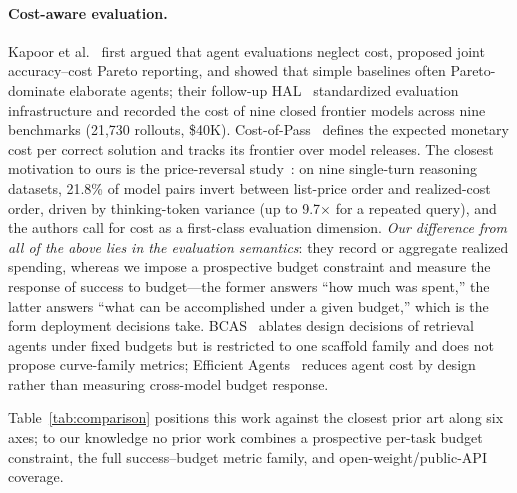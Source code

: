 \documentclass[preprint,authoryear,12pt]{elsarticle}
\begin{document}
\paragraph{Cost-aware evaluation.} Kapoor et al.~\cite{kapoor2025aiagentsmatter} first argued that agent evaluations neglect cost, proposed joint accuracy--cost Pareto reporting, and showed that simple baselines often Pareto-dominate elaborate agents; their follow-up HAL~\cite{kapoor2025holisticagentleaderboard} standardized evaluation infrastructure and recorded the cost of nine closed frontier models across nine benchmarks (21{,}730 rollouts, \$40K). Cost-of-Pass~\cite{erol2025costofpass} defines the expected monetary cost per correct solution and tracks its frontier over model releases. The closest motivation to ours is the price-reversal study~\cite{chen2026pricereversal}: on nine single-turn reasoning datasets, 21.8\% of model pairs invert between list-price order and realized-cost order, driven by thinking-token variance (up to 9.7$\times$ for a repeated query), and the authors call for cost as a first-class evaluation dimension. \emph{Our difference from all of the above lies in the evaluation semantics}: they record or aggregate realized spending, whereas we impose a prospective budget constraint and measure the response of success to budget---the former answers ``how much was spent,'' the latter answers ``what can be accomplished under a given budget,'' which is the form deployment decisions take. BCAS~\cite{mccleary2026budgetconstrainedsearch} ablates design decisions of retrieval agents under fixed budgets but is restricted to one scaffold family and does not propose curve-family metrics; Efficient Agents~\cite{wang2025efficientagents} reduces agent cost by design rather than measuring cross-model budget response.

Table~\ref{tab:comparison} positions this work against the closest prior art along six axes; to our knowledge no prior work combines a prospective per-task budget constraint, the full success--budget metric family, and open-weight/public-API coverage.
\end{document}
